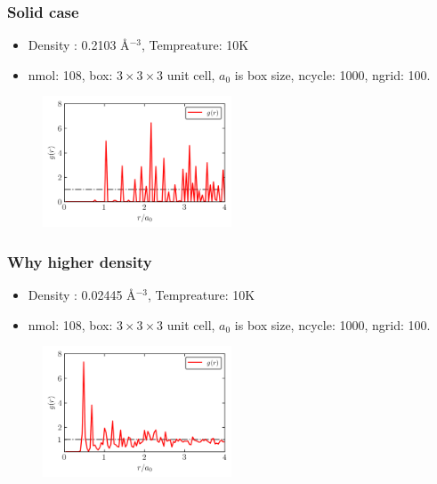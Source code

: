 \documentclass[10pt,t]{beamer}
\begin{document}
\begin{frame}
    \frametitle{Solid case}
    \begin{itemize}
    \vspace{-0.6em}
    \setlength\itemsep{1em}
        \item Density : 0.2103 \AA$^{-3}$, Tempreature: 10K
        \item nmol: 108, box: $3 \times 3 \times 3$ unit cell, $a_0$ is box size, ncycle: 1000, ngrid: 100.
    \end{itemize}
    \begin{figure} %
        \centering
        \includegraphics[width=0.5\textwidth]{figures/Ar_10K_333_high.png} 
    \end{figure}
\end{frame}

\begin{frame}
    \frametitle{Why higher density}
    \begin{itemize}
    \vspace{-0.6em}
    \setlength\itemsep{1em}
        \item Density : 0.02445 \AA$^{-3}$, Tempreature: 10K
        \item nmol: 108, box: $3 \times 3 \times 3$ unit cell, $a_0$ is box size, ncycle: 1000, ngrid: 100.
    \end{itemize}
    \begin{figure} %
        \centering
        \includegraphics[width=0.5\textwidth]{figures/Ar_10K_333.png} 
    \end{figure}
\end{frame}
\end{document}
